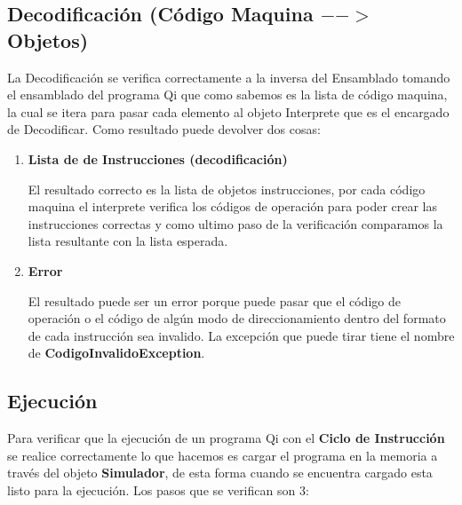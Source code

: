 \subsection{Decodificación (Código Maquina $-->$ Objetos)}
La Decodificación se verifica correctamente a la inversa del Ensamblado tomando el ensamblado del programa Qi que como sabemos es la lista de código maquina, la cual se itera para pasar cada elemento al objeto Interprete que es el encargado de Decodificar. Como resultado puede devolver dos cosas: 
\begin{enumerate}
\item \textbf{Lista de de Instrucciones (decodificación)} 

El resultado correcto es la lista de objetos instrucciones, por cada código maquina el interprete verifica los códigos de operación para poder crear las instrucciones correctas y como ultimo paso de la verificación comparamos la lista resultante con la lista esperada.
\item\textbf{Error}

El resultado puede ser un error porque puede pasar que el código de operación o el código de algún modo de direccionamiento dentro del formato de cada instrucción sea invalido. La excepción que puede tirar tiene el nombre de \textbf{CodigoInvalidoException}.   
\end{enumerate}

\subsection{Ejecución}

Para verificar que la ejecución de un programa Qi con el \textbf{Ciclo de Instrucción} se realice correctamente lo que hacemos es cargar el programa en la memoria a través del objeto \textbf{Simulador}, de esta forma cuando se encuentra cargado esta listo para la ejecución. Los pasos que se verifican son 3:

